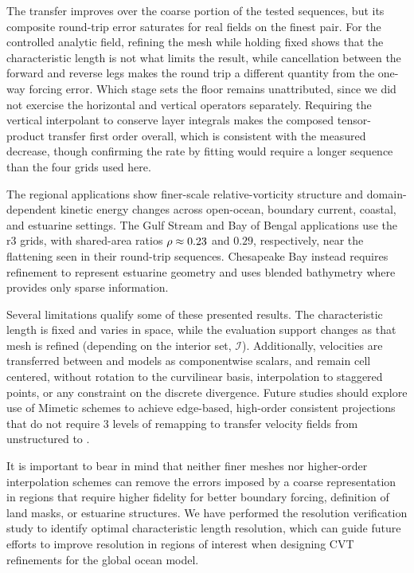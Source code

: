 
The transfer improves over the coarse portion of the tested sequences, but its composite round-trip error saturates for real fields on the finest pair. For the controlled analytic field, refining the \ROMS mesh while holding \MPAS fixed shows that the \ROMS characteristic length is not what limits the result, while cancellation between the forward and reverse legs makes the round trip a different quantity from the one-way forcing error. Which stage sets the floor remains unattributed, since we did not exercise the horizontal and vertical operators separately. Requiring the vertical interpolant to conserve layer integrals makes the composed tensor-product transfer first order overall, which is consistent with the measured decrease, though confirming the rate by fitting would require a longer sequence than the four grids used here.

The regional applications show finer-scale relative-vorticity structure and domain-dependent kinetic energy changes across open-ocean, boundary current, coastal, and estuarine settings. The Gulf Stream and Bay of Bengal applications use the r3 grids, with shared-area ratios $\rho\approx0.23$ and $0.29$, respectively, near the flattening seen in their round-trip sequences. Chesapeake Bay instead requires refinement to represent estuarine geometry and uses blended bathymetry where \MPAS provides only sparse information.

Several limitations qualify some of these presented results. The \MPAS characteristic length is fixed and varies in space, while the \ROMS evaluation support changes as that mesh is refined (depending on the interior set, $\mathcal{I}$). Additionally, velocities are transferred between \MPAS and \ROMS models as componentwise scalars, and remain cell centered, without rotation to the \ROMS curvilinear basis, interpolation to staggered points, or any constraint on the discrete divergence. Future studies should explore use of Mimetic schemes to achieve edge-based, high-order consistent projections that do not require 3 levels of remapping to transfer velocity fields from unstructured \MPAS to \ROMS. 

It is important to bear in mind that neither finer \ROMS meshes nor higher-order interpolation schemes can remove the errors imposed by a coarse \MPAS representation in regions that require higher fidelity for better boundary forcing, definition of land masks, or estuarine structures. We have performed the resolution verification study to identify optimal characteristic length resolution, which can guide future efforts to improve resolution in regions of interest when designing CVT refinements for the \MPAS global ocean model.


%

